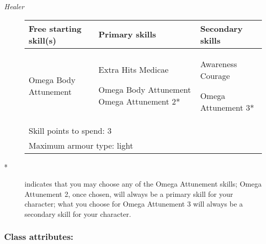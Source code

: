 \textit{Healer}

\begin{description}
\item[]
    \begin{table}[H]
\begin{tabular}{|l|l|l|} \hline 
Free starting skill(s) & Primary skills & Secondary skills \\
 \hline Omega Body Attunement & Extra Hits Medicae\par Omega Body Attunement Omega Attunement 2* & Awareness Courage\par Omega Attunement 3* \\
 \hline \multicolumn{3}{|l|}{Skill points to spend: 3} \\
 \hline \multicolumn{3}{|l|}{Maximum armour type: light} \\
 \hline \end{tabular}

\end{table}

\item[	*]indicates that you may choose any of the Omega Attunement skills; Omega Attunement 2, once chosen, will always be a primary skill for your character; what you choose for Omega Attunement 3 will always be a secondary skill for your character.

\end{description}

\subsubsection{Class attributes:}

